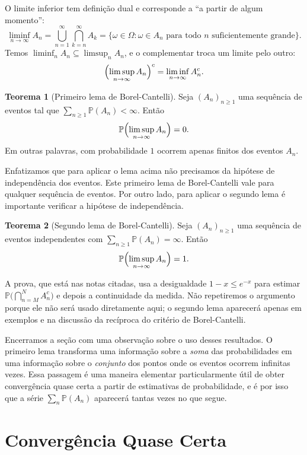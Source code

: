 \documentclass[12pt,portuguese]{article}
\theoremstyle{definition}
\newtheorem{theorem}{Teorema}
\theoremstyle{plainexercise}
\theoremstyle{starredexercise}
\theoremstyle{definition}
\begin{document}
O limite inferior tem definição dual e corresponde a ``a partir de algum
momento'':
\[
\liminf_{n\to\infty}A_n
=
\bigcup_{n=1}^{\infty}\bigcap_{k=n}^{\infty}A_k
=
\{\omega\in\Omega:\omega\in A_n\text{ para todo }n\text{ suficientemente grande}\}.
\]
Temos $\liminf_n A_n\subseteq\limsup_n A_n$, e o complementar troca um limite
pelo outro:
\[
\Bigl(\limsup_{n\to\infty}A_n\Bigr)^c
=
\liminf_{n\to\infty}A_n^c.
\]

\begin{theorem}[Primeiro lema de Borel-Cantelli]\label{thm:bc1}
Seja $(A_n)_{n\geqslant1}$ uma sequência de eventos tal que
$\sum_{n\geqslant1}\mathbb{P}(A_n)<\infty$. Então
\[
\mathbb{P}\Bigl(\limsup_{n\to\infty}A_n\Bigr)=0.
\]
Em outras palavras, com probabilidade $1$ ocorrem apenas finitos dos eventos
$A_n$.
\end{theorem}

Enfatizamos que para aplicar o lema acima não precisamos da hipótese de independência
dos eventos. Este primeiro lema de Borel-Cantelli vale para qualquer sequência de
eventos. Por outro lado, para aplicar o segundo lema é importante verificar a hipótese
de independência. 

\begin{theorem}[Segundo lema de Borel-Cantelli]\label{thm:bc2}
Seja $(A_n)_{n\geqslant1}$ uma sequência de eventos independentes com
$\sum_{n\geqslant1}\mathbb{P}(A_n)=\infty$. Então
\[
\mathbb{P}\Bigl(\limsup_{n\to\infty}A_n\Bigr)=1.
\]
\end{theorem}

A prova, que está nas notas citadas, usa a desigualdade $1-x\leqslant e^{-x}$ para
estimar $\mathbb{P}\bigl(\bigcap_{n=M}^{N}A_n^c\bigr)$ e depois a continuidade
da medida. Não repetiremos o argumento porque ele não será usado diretamente
aqui; o segundo lema aparecerá apenas em exemplos e na discussão da recíproca
do critério de Borel-Cantelli.

Encerramos a seção com uma observação sobre o uso desses resultados. O primeiro
lema transforma uma informação sobre a \emph{soma} das probabilidades em uma
informação sobre o \emph{conjunto} dos pontos onde os eventos ocorrem
infinitas vezes. Essa passagem é uma maneira elementar particularmente útil de
obter convergência quase certa a partir de estimativas de probabilidade, e é por isso
que a série $\sum_n\mathbb{P}(A_n)$ aparecerá tantas vezes no que segue.

\section{Convergência Quase Certa}\label{sec:quase-certa}
\end{document}
